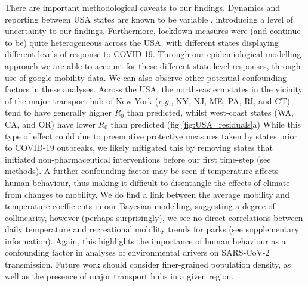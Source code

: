 \documentclass[12pt,english,a4paper]{article}
\newcommand{\virus}{SARS-CoV-2\xspace}
\newcommand{\disease}{COVID-19\xspace}
\newcommand{\RO}{$R_0$\xspace}
\begin{document}
There are important methodological caveats to our findings.
Dynamics and reporting between USA states are known to be variable \cite{Javan2020}, introducing a level of uncertainty to our findings. 
Furthermore, lockdown measures were (and continue to be) quite heterogeneous across the USA, with different states displaying different levels of response to \disease \cite{Neofotistos2020}. Through our epidemiological modelling approach we are able to account for these different state-level responses, through use of google mobility data.
We can also observe other potential confounding factors in these analyses. 
Across the USA, the north-eastern states in the vicinity of the major transport hub of New York (\emph{e.g.}, NY, NJ, ME, PA, RI, and CT) tend to have generally higher \RO than predicted, whilst west-coast states (WA, CA, and OR) have lower \RO than predicted (fig \ref{fig:USA_residuals}a)
While this type of effect could due to preemptive protective measures taken by states prior to COVID-19 outbreaks, we likely mitigated this by removing states that initiated non-pharmaceutical interventions before our first time-step (see methods).
A further confounding factor may be seen if temperature affects human behaviour, thus making it difficult to disentangle the effects of climate from changes to mobility. We do find a link between the average mobility and temperature coefficients in our Bayesian modelling, suggesting a degree of collinearity, however (perhaps surprisingly), we see no direct correlations between daily temperature and recreational mobility trends for parks (see supplementary information). Again, this highlights the importance of human behaviour as a confounding factor in analyses of environmental drivers on \virus transmission. Future work should consider finer-grained population density, as well as the presence of major transport hubs in a given region.
\end{document}
